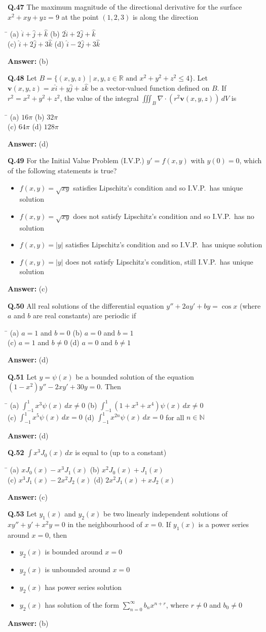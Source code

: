 \documentclass[11pt,a4paper]{article}
\newcommand{\optsfour}[4]{%
  \begin{tabbing}
    \hspace{0.48\linewidth}\=\kill
    (a) #1 \> (b) #2 \\[2pt]
    (c) #3 \> (d) #4
  \end{tabbing}%
}
\newcommand{\optslist}[4]{%
  \begin{itemize}
    \setlength{\itemsep}{2pt}\setlength{\parskip}{0pt}
    \item[(a)] #1
    \item[(b)] #2
    \item[(c)] #3
    \item[(d)] #4
  \end{itemize}%
}
\newcommand{\ans}[1]{\textbf{Answer:} #1\par\medskip}
\begin{document}
\textbf{Q.47} The maximum magnitude of the directional derivative for the surface $x^2 + xy + yz = 9$ at the point $(1, 2, 3)$ is along the direction
\optsfour{$\hat{i} + \hat{j} + \hat{k}$}{$2\hat{i} + 2\hat{j} + \hat{k}$}{$\hat{i} + 2\hat{j} + 3\hat{k}$}{$\hat{i} - 2\hat{j} + 3\hat{k}$}
\ans{(b)}

\textbf{Q.48} Let $B = \{(x,y,z) \mid x,y,z \in \mathbb{R} \text{ and } x^2 + y^2 + z^2 \le 4\}$. Let $\mathbf{v}(x,y,z) = x\hat{i} + y\hat{j} + z\hat{k}$ be a vector-valued function defined on $B$. If $r^2 = x^2 + y^2 + z^2$, the value of the integral $\displaystyle\iiint_B \nabla \cdot (r^2 \mathbf{v}(x,y,z))\,dV$ is
\optsfour{$16\pi$}{$32\pi$}{$64\pi$}{$128\pi$}
\ans{(d)}

\textbf{Q.49} For the Initial Value Problem (I.V.P.) $y' = f(x,y)$ with $y(0) = 0$, which of the following statements is true?
\optslist{$f(x,y) = \sqrt{xy}$ satisfies Lipschitz's condition and so I.V.P.\ has unique solution}{$f(x,y) = \sqrt{xy}$ does not satisfy Lipschitz's condition and so I.V.P.\ has no solution}{$f(x,y) = |y|$ satisfies Lipschitz's condition and so I.V.P.\ has unique solution}{$f(x,y) = |y|$ does not satisfy Lipschitz's condition, still I.V.P.\ has unique solution}
\ans{(c)}

\textbf{Q.50} All real solutions of the differential equation $y'' + 2ay' + by = \cos x$ (where $a$ and $b$ are real constants) are periodic if
\optsfour{$a = 1$ and $b = 0$}{$a = 0$ and $b = 1$}{$a = 1$ and $b \ne 0$}{$a = 0$ and $b \ne 1$}
\ans{(d)}

\textbf{Q.51} Let $y = \psi(x)$ be a bounded solution of the equation $(1 - x^2)y'' - 2xy' + 30y = 0$. Then
\optsfour{$\displaystyle\int_{-1}^{1} x^3 \psi(x)\,dx \ne 0$}{$\displaystyle\int_{-1}^{1} (1 + x^3 + x^4)\psi(x)\,dx \ne 0$}{$\displaystyle\int_{-1}^{1} x^5 \psi(x)\,dx = 0$}{$\displaystyle\int_{-1}^{1} x^{2n} \psi(x)\,dx = 0$ for all $n \in \mathbb{N}$}
\ans{(d)}

\textbf{Q.52} $\displaystyle\int x^3 J_0(x)\,dx$ is equal to (up to a constant)
\optsfour{$x J_0(x) - x^3 J_1(x)$}{$x^2 J_0(x) + J_1(x)$}{$x^3 J_1(x) - 2x^2 J_2(x)$}{$2x^2 J_1(x) + x J_2(x)$}
\ans{(c)}

\textbf{Q.53} Let $y_1(x)$ and $y_2(x)$ be two linearly independent solutions of $xy'' + y' + x^2 y = 0$ in the neighbourhood of $x = 0$. If $y_1(x)$ is a power series around $x = 0$, then
\optslist{$y_2(x)$ is bounded around $x = 0$}{$y_2(x)$ is unbounded around $x = 0$}{$y_2(x)$ has power series solution}{$y_2(x)$ has solution of the form $\displaystyle\sum_{n=0}^{\infty} b_n x^{n+r}$, where $r \ne 0$ and $b_0 \ne 0$}
\ans{(b)}
\end{document}
